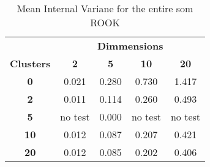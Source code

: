 \begin{table}
\caption{Mean Internal Variane for the entire som ROOK}
\label{ivtable2}
\begin{tabular}{|c||c|c|c|c|}
\hline
&\multicolumn{4}{c|}{\textbf{Dimmensions}}\\
\textbf{Clusters} & \multicolumn{1}{c}{\textbf{2}} &
\multicolumn{1}{c}{\textbf{5}} & \multicolumn{1}{c}{\textbf{10}} &
\multicolumn{1}{c|}{\textbf{20}}\\
\hline
\hline
\textbf{0} & 0.021& 0.280& 0.730& 1.417 \\
\hline
\textbf{2} & 0.011& 0.114& 0.260& 0.493 \\
\hline
\textbf{5} & no test& 0.000& no test& no test \\
\hline
\textbf{10} & 0.012& 0.087& 0.207& 0.421 \\
\hline
\textbf{20} & 0.012& 0.085& 0.202& 0.406 \\
\hline
\end{tabular} \end{table}

